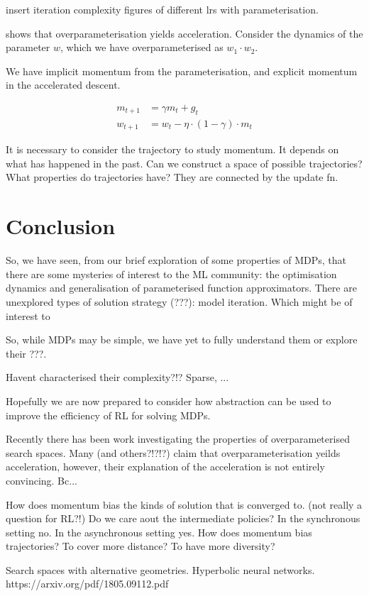 {\color{red}insert iteration complexity figures of different lrs with parameterisation.}

\cite{Arora2018} shows that overparameterisation yields acceleration. Consider
the dynamics of the parameter $w$, which we have overparameterised as $w_1 \cdot w_2$.



We have implicit momentum from the parameterisation, and explicit momentum in the accelerated descent.


\begin{align}
m_{t+1} &= \gamma m_t + g_t \\
w_{t+1} &= w_t - \eta \cdot (1-\gamma) \cdot m_t
\end{align}

It is necessary to consider the trajectory to study momentum. It depends
on what has happened in the past. Can we construct a space of possible
trajectories? What properties do trajectories have? They are connected
by the update fn.


\section{Conclusion}

So, we have seen, from our brief exploration of some properties of MDPs, that
there are some mysteries of interest to the ML community: the optimisation dynamics and generalisation of
parameterised function approximators.
There are unexplored types of solution strategy (???): model iteration. Which might be of interest to

So, while MDPs may be simple, we have yet to fully understand them or explore their ???.

Havent characterised their complexity?!? Sparse, ...

Hopefully we are now prepared to consider how abstraction can be used to improve the efficiency of RL for solving MDPs.



Recently there has been work investigating the properties of overparameterised search spaces.
Many \cite{Arora2018} (and others?!?!?) claim that overparameterisation yeilds acceleration, however,
their explanation of the acceleration is not entirely convincing. Bc...

How does momentum bias the kinds of solution that is converged to. (not really a question for RL?!)
Do we care aout the intermediate policies? In the synchronous setting no. In the asynchronous setting yes.
How does momentum bias trajectories? To cover more distance? To have more diversity?

Search spaces with alternative geometries.
Hyperbolic neural networks. https://arxiv.org/pdf/1805.09112.pdf
